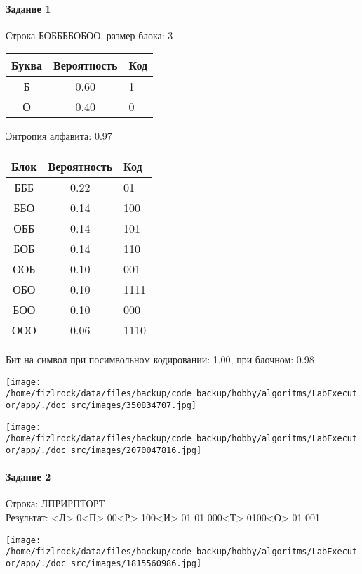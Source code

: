 \documentclass[a4paper, 12pt]{article}
\begin{document}
\paragraph{Задание 1}

Строка БОББББОБОО, размер блока: 3
\begin{center}
 \begin{tabular}{ |c|c|l| } 
  \hline
     Буква & Вероятность & Код\\ \hline
Б & 0.60 & 1\\\hline
О & 0.40 & 0
\\ \hline \end{tabular}
\end{center}
Энтропия алфавита: 0.97
\begin{center}
 \begin{tabular}{ |c|c|l| } 
  \hline
     Блок & Вероятность & Код\\ \hline
БББ & 0.22 & 01\\\hline
ББО & 0.14 & 100\\\hline
ОББ & 0.14 & 101\\\hline
БОБ & 0.14 & 110\\\hline
ООБ & 0.10 & 001\\\hline
ОБО & 0.10 & 1111\\\hline
БОО & 0.10 & 000\\\hline
ООО & 0.06 & 1110
\\ \hline \end{tabular}
\end{center}
Бит на символ при посимвольном кодировании: 1.00, при блочном: 0.98

\texttt{[image: /home/fizlrock/data/files/backup/code\_backup/hobby/algoritms/LabExecutor/app/./doc\_src/images/350834707.jpg]}

\texttt{[image: /home/fizlrock/data/files/backup/code\_backup/hobby/algoritms/LabExecutor/app/./doc\_src/images/2070047816.jpg]}
\pagebreak
\paragraph{Задание 2}

Строка: 
ЛПРИРПТОРТ\\
Результат: <Л> 0<П> 00<Р> 100<И> 01 01 000<Т> 0100<О> 01 001

\texttt{[image: /home/fizlrock/data/files/backup/code\_backup/hobby/algoritms/LabExecutor/app/./doc\_src/images/1815560986.jpg]}
\end{document}
